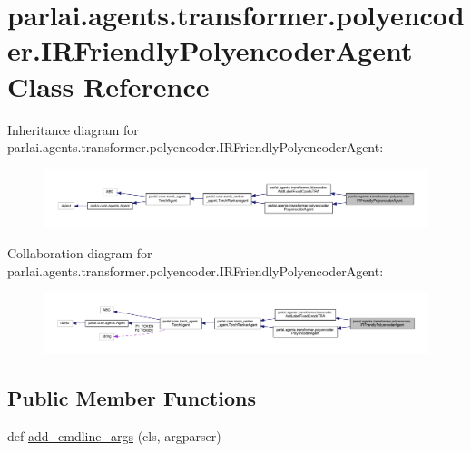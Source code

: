 \hypertarget{classparlai_1_1agents_1_1transformer_1_1polyencoder_1_1IRFriendlyPolyencoderAgent}{}\section{parlai.\+agents.\+transformer.\+polyencoder.\+I\+R\+Friendly\+Polyencoder\+Agent Class Reference}
\label{classparlai_1_1agents_1_1transformer_1_1polyencoder_1_1IRFriendlyPolyencoderAgent}


Inheritance diagram for parlai.\+agents.\+transformer.\+polyencoder.\+I\+R\+Friendly\+Polyencoder\+Agent\+:
\nopagebreak
\begin{figure}[H]
\begin{center}
\leavevmode
\includegraphics[width=350pt]{df/d4d/classparlai_1_1agents_1_1transformer_1_1polyencoder_1_1IRFriendlyPolyencoderAgent__inherit__graph}
\end{center}
\end{figure}


Collaboration diagram for parlai.\+agents.\+transformer.\+polyencoder.\+I\+R\+Friendly\+Polyencoder\+Agent\+:
\nopagebreak
\begin{figure}[H]
\begin{center}
\leavevmode
\includegraphics[width=350pt]{d1/d87/classparlai_1_1agents_1_1transformer_1_1polyencoder_1_1IRFriendlyPolyencoderAgent__coll__graph}
\end{center}
\end{figure}
\subsection*{Public Member Functions}
\begin{DoxyCompactItemize}
\item 
def \hyperlink{classparlai_1_1agents_1_1transformer_1_1polyencoder_1_1IRFriendlyPolyencoderAgent_afbf30376e853d1a5f9a52b1ae3453aa2}{add\+\_\+cmdline\+\_\+args} (cls, argparser)
\end{DoxyCompactItemize}
